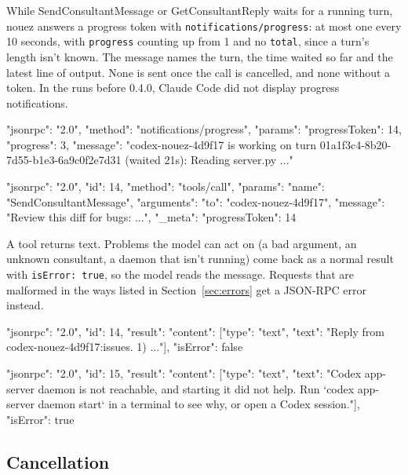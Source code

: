 \documentclass[10pt,a4paper]{article}
\newcommand{\code}[1]{\texttt{#1}}
\begin{document}
While SendConsultantMessage or GetConsultantReply waits for a running turn, nouez answers a
progress token with \code{notifications/progress}: at most one every 10 seconds, with
\code{progress} counting up from 1 and no \code{total}, since a turn's length isn't known. The
message names the turn, the time waited so far and the latest line of output. None is sent once
the call is cancelled, and none without a token. In the runs before 0.4.0, Claude Code did not
display progress notifications.

\begin{wire}
{"jsonrpc": "2.0", "method": "notifications/progress", "params": {"progressToken": 14, "progress": 3,
  "message": "codex-nouez-4d9f17 is working on turn 01a1f3c4-8b20-7d55-b1e3-6a9c0f2e7d31 (waited 21s): Reading server.py ..."}}
\end{wire}

\begin{wire}
{"jsonrpc": "2.0", "id": 14, "method": "tools/call", "params": {
  "name": "SendConsultantMessage",
  "arguments": {"to": "codex-nouez-4d9f17", "message": "Review this diff for bugs: ..."},
  "_meta": {"progressToken": 14}}}
\end{wire}

A tool returns text. Problems the model can act on (a bad argument, an unknown consultant, a
daemon that isn't running) come back as a normal result with \code{isError: true}, so the model
reads the message. Requests that are malformed in the ways listed in Section~\ref{sec:errors}
get a JSON-RPC error instead.

\begin{wire}
{"jsonrpc": "2.0", "id": 14, "result": {"content": [{"type": "text",
  "text": "Reply from codex-nouez-4d9f17:\n\nTwo issues. 1) ..."}], "isError": false}}
\end{wire}
\begin{wire}
{"jsonrpc": "2.0", "id": 15, "result": {"content": [{"type": "text",
  "text": "Codex app-server daemon is not reachable, and starting it did not help. Run `codex app-server daemon start` in a terminal to see why, or open a Codex session."}],
  "isError": true}}
\end{wire}

\subsection{Cancellation}
\end{document}
